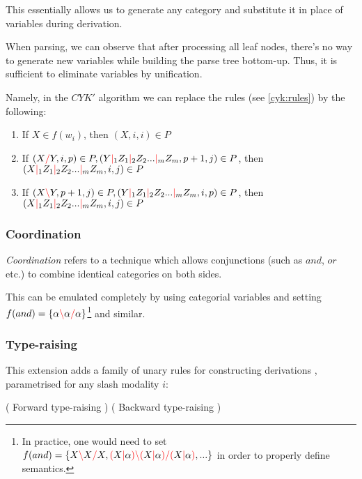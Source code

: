 \documentclass[main.tex]{subfiles}
\begin{document}
This essentially allows us to generate any category and substitute it in place
of variables during derivation.

When parsing, we can observe that after processing all leaf nodes,
there's no way to generate new variables while building the parse tree
bottom-up. Thus, it is sufficient to eliminate variables by unification.

Namely, in the $CYK'$ algorithm we can replace the rules (see \ref{cyk:rules})
by the following:

\begin{enumerate}
    \item If $X \in f(w_i)$, then $(X, i, i) \in P$
    \item If $(X \textcolor{red}{/} Y, i, p) \in P, (Y \textcolor{red}{|}_1 Z_1 \textcolor{red}{|}_2 Z_2 ... \textcolor{red}{|}_m Z_m, p + 1, j) \in P$,
        then $(X \textcolor{red}{|}_1 Z_1 \textcolor{red}{|}_2 Z_2 ... \textcolor{red}{|}_m Z_m, i, j) \in P$
    \item If $(X \textcolor{red}{\backslash} Y, p + 1, j) \in P, (Y \textcolor{red}{|}_1 Z_1 \textcolor{red}{|}_2 Z_2 ... \textcolor{red}{|}_m Z_m, i, p) \in P$,
        then $(X \textcolor{red}{|}_1 Z_1 \textcolor{red}{|}_2 Z_2 ... \textcolor{red}{|}_m Z_m, i, j) \in P$
\end{enumerate}

\subsubsection{Coordination}
\emph{Coordination} refers to a technique which allows conjunctions (such as
$and$, $or$ etc.) to combine identical categories on both sides.

This can be emulated completely by using categorial variables and setting
$f(and) = \{ \alpha \textcolor{red}{\backslash} \alpha \textcolor{red}{/} \alpha \}$\footnote{
    In practice, one would need to set
    $f(and) = \{ X \textcolor{red}{\backslash} X \textcolor{red}{/} X, \textcolor{red}{(} X \textcolor{red}{|} \alpha \textcolor{red}{)} \textcolor{red}{\backslash} \textcolor{red}{(} X \textcolor{red}{|} \alpha \textcolor{red}{)} \textcolor{red}{/} \textcolor{red}{(} X \textcolor{red}{|} \alpha \textcolor{red}{)}, ...\}$
    in order to properly define semantics.
} and similar.

\subsubsection{Type-raising}
This extension adds a family of unary rules for constructing derivations \cite[sec.~5.3.1]{nts},
parametrised for any slash modality $i$:
\begin{center}
        ( Forward type-raising )
        ( Backward type-raising )
\end{center}
\end{document}

